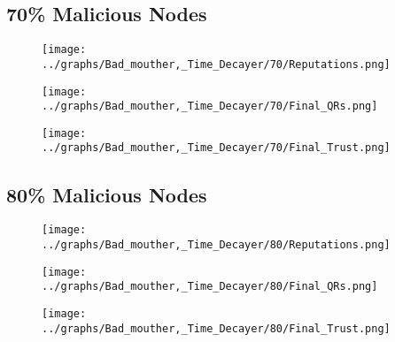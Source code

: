 \documentclass{article}
\begin{document}
  \begin{minipage}[t]{0.49\columnwidth}
    \subsection*{70\% Malicious Nodes}
        \begin{figure}[H]
            \centering
            \texttt{[image: ../graphs/Bad\_mouther,\_Time\_Decayer/70/Reputations.png]}
        \end{figure}
        \begin{figure}[H]
            \centering
            \texttt{[image: ../graphs/Bad\_mouther,\_Time\_Decayer/70/Final\_QRs.png]}
        \end{figure}
    \end{minipage}
    \begin{minipage}[t]{0.49\columnwidth}
        \begin{figure}[H]
            \centering
            \texttt{[image: ../graphs/Bad\_mouther,\_Time\_Decayer/70/Final\_Trust.png]}
        \end{figure}
    \end{minipage}

  \begin{minipage}[t]{0.49\columnwidth}
    \subsection*{80\% Malicious Nodes}
        \begin{figure}[H]
            \centering
            \texttt{[image: ../graphs/Bad\_mouther,\_Time\_Decayer/80/Reputations.png]}
        \end{figure}
        \begin{figure}[H]
            \centering
            \texttt{[image: ../graphs/Bad\_mouther,\_Time\_Decayer/80/Final\_QRs.png]}
        \end{figure}
    \end{minipage}
    \begin{minipage}[t]{0.49\columnwidth}
        \begin{figure}[H]
            \centering
            \texttt{[image: ../graphs/Bad\_mouther,\_Time\_Decayer/80/Final\_Trust.png]}
        \end{figure}
    \end{minipage}
\end{document}
